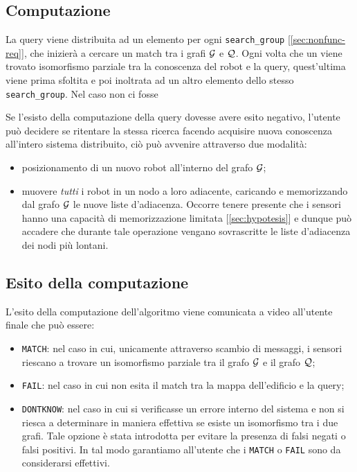 \documentclass{llncs}
\begin{document}
\subsection{Computazione}
\label{sec:computation}
La query viene distribuita ad un elemento per ogni \texttt{search\_group} [\ref*{sec:nonfunc-req}],
che inizierà a cercare un match tra i grafi $\mathcal{G}$ e $\mathcal{Q}$. Ogni volta che un viene trovato isomorfismo
parziale tra la conoscenza del robot e la query, quest'ultima viene prima sfoltita e poi inoltrata ad
un altro elemento dello stesso \texttt{search\_group}. Nel caso non ci fosse 

Se l'esisto della computazione della query dovesse avere esito negativo,
l'utente può decidere se ritentare la stessa ricerca facendo acquisire nuova conoscenza
all'intero sistema distribuito, ciò può avvenire attraverso due modalità:
\begin{itemize}
	\item posizionamento di un nuovo robot all'interno del grafo $\mathcal{G}$;
	\item muovere \emph{tutti} i robot in un nodo a loro adiacente, caricando e memorizzando
	dal grafo $\mathcal{G}$ le nuove liste d'adiacenza. Occorre tenere presente che i sensori hanno
	una capacità di memorizzazione limitata [\ref{sec:hypotesis}] e dunque può accadere che durante
	tale operazione vengano sovrascritte  le liste d'adiacenza dei nodi più lontani.
\end{itemize}

\subsection{Esito della computazione}
L'esito della computazione dell'algoritmo viene comunicata a video all'utente finale che può essere:
\begin{itemize}
\item \texttt{MATCH}: nel caso in cui, unicamente attraverso scambio di messaggi, i sensori riescano a trovare
un isomorfismo parziale tra il grafo $\mathcal{G}$ e il grafo $\mathcal{Q}$;
\item \texttt{FAIL}: nel caso in cui non esita il match tra la mappa dell'edificio e la query;
\item \texttt{DONTKNOW}: nel caso in cui si verificasse un errore interno del sistema e
non si riesca a determinare in maniera effettiva se esiste un isomorfismo tra i due grafi. Tale opzione
è stata introdotta per evitare la presenza di falsi negati o falsi positivi. In tal modo garantiamo all'utente
che i  \texttt{MATCH} o \texttt{FAIL} sono da considerarsi effettivi.
\end{itemize}
\end{document}
